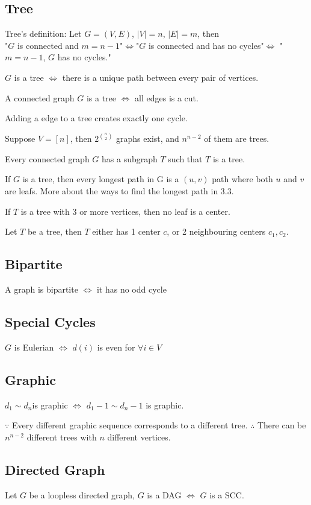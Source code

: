 \documentclass[12pt,a4paper]{ctexrep}
\begin{document}
\subsection{Tree}
Tree's definition: Let $G=(V,E)$, $|V|=n$, $|E|=m$, then \\
"$G$ is connected and $m=n-1$"$\iff$"$G$ is connected and has no cycles"$\iff$ "$m = n-1$, $G$ has no cycles."

$G$ is a tree $\iff$ there is a unique path between every pair of vertices.

A connected graph $G$ is a tree $\iff$ all edges is a cut.

Adding a edge to a tree creates exactly one cycle.

Suppose $V=[n]$, then $2^{\binom{n}{2}}$ graphs exist, and $n^{n-2}$ of them are trees.

Every connected graph $G$ has a subgraph $T$ such that $T$ is a tree.

If $G$ is a tree, then every longest path in G is a $(u,v)$ path where both $u$ and $v$ are leafs. More about the ways to find the longest path in 3.3.

If $T$ is a tree with 3 or more vertices, then no leaf is a center.

Let $T$ be a tree, then $T$ either has 1 center $c$, or 2 neighbouring centers $c_{1},c_{2}$.
\subsection{Bipartite}
A graph is bipartite $\iff$ it has no odd cycle
\subsection{Special Cycles}
$G$ is Eulerian $\iff$ $d(i)$ is even for $\forall i \in V$
\subsection{Graphic}
$d_{1} \sim d_{n}$is graphic $\iff$ $d_{1}-1 \sim d_{n}-1$ is graphic.

$\because$ Every different graphic sequence corresponds to a different tree. $\therefore$ There can be $n^{n-2}$ different trees with $n$ different vertices.
\subsection{Directed Graph}
Let $G$ be a loopless directed graph, $G$ is a DAG $\iff$ $G$ is a SCC.
\end{document}
